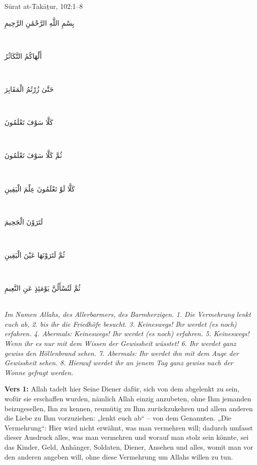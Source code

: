\begin{quranvers}{Sūrat at-Takāṯur, 102:1--8}
{\quranfont\begin{Arabic}
بِسْمِ اللَّهِ الرَّحْمَٰنِ الرَّحِيمِ
\end{Arabic}}\\[2mm]
{\quranfont\begin{Arabic}
أَلْهَاكُمُ التَّكَاثُرُ
\end{Arabic}}\\[2mm]
{\quranfont\begin{Arabic}
حَتَّىٰ زُرْتُمُ الْمَقَابِرَ
\end{Arabic}}\\[2mm]
{\quranfont\begin{Arabic}
كَلَّا سَوْفَ تَعْلَمُونَ
\end{Arabic}}\\[2mm]
{\quranfont\begin{Arabic}
ثُمَّ كَلَّا سَوْفَ تَعْلَمُونَ
\end{Arabic}}\\[2mm]
{\quranfont\begin{Arabic}
كَلَّا لَوْ تَعْلَمُونَ عِلْمَ الْيَقِينِ
\end{Arabic}}\\[2mm]
{\quranfont\begin{Arabic}
لَتَرَوْنَ الْجَحِيمَ
\end{Arabic}}\\[2mm]
{\quranfont\begin{Arabic}
ثُمَّ لَتَرَوْنَهَا عَيْنَ الْيَقِينِ
\end{Arabic}}\\[2mm]
{\quranfont\begin{Arabic}
ثُمَّ لَتُسْأَلُنَّ يَوْمَئِذٍ عَنِ النَّعِيمِ
\end{Arabic}}\\[3mm]
\emph{Im Namen Allahs, des Allerbarmers, des Barmherzigen. 1. Die Vermehrung lenkt euch ab,
2. bis ihr die Friedhöfe besucht. 3. Keineswegs! Ihr werdet (es noch) erfahren. 4. Abermals:
Keineswegs! Ihr werdet (es noch) erfahren. 5. Keineswegs! Wenn ihr es nur mit dem Wissen der
Gewissheit wüsstet! 6. Ihr werdet ganz gewiss den Höllenbrand sehen. 7. Abermals: Ihr werdet
ihn mit dem Auge der Gewissheit sehen. 8. Hierauf werdet ihr an jenem Tag ganz gewiss nach
der Wonne gefragt werden.}
\end{quranvers}

\textbf{Vers 1:} Allah  tadelt hier Seine Diener dafür, sich von dem abgelenkt zu sein, wofür
sie erschaffen wurden, nämlich Allah einzig anzubeten, ohne Ihm jemanden beizugesellen, Ihn zu
kennen, reumütig zu Ihm zurückzukehren und allem anderen die Liebe zu Ihm vorzuziehen:
„lenkt euch ab“ – von dem Genannten. „Die Vermehrung“: Hier wird nicht erwähnt, was man
vermehren will; dadurch umfasst dieser Ausdruck alles, was man vermehren und worauf man
stolz sein könnte, sei das Kinder, Geld, Anhänger, Soldaten, Diener, Ansehen und alles, womit
man vor den anderen angeben will, ohne diese Vermehrung um Allahs willen zu tun.

